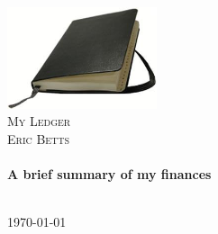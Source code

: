\begin{titlepage}

\begin{center}


\includegraphics[width=0.33\textwidth]{templates/bettse/logo}\\[1cm]    

\textsc{\LARGE My Ledger}\\[1.5cm]

\textsc{\Large Eric Betts}\\[0.5cm]


\HRule \\[0.4cm]
{ \huge \bfseries A brief summary of my finances}\\[0.4cm]

\HRule \\[1.5cm]

\vfill

{\large \today }
{\large \currenttime }

\end{center}

\end{titlepage}
